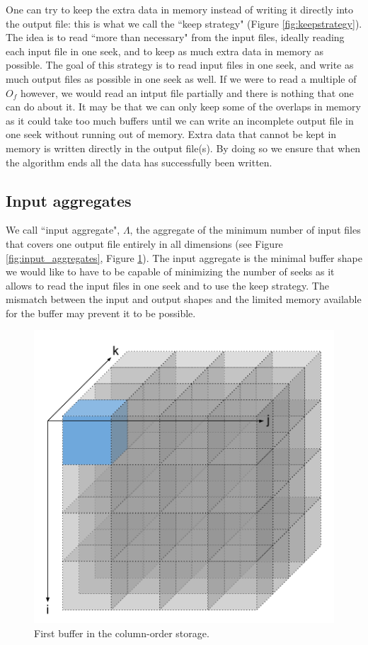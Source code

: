 \documentclass[conference]{IEEEtran}
\begin{document}
One can try to keep the extra data in memory instead of writing it directly into the output file: this is what we call the ``keep strategy" (Figure \ref{fig:keepstrategy}).
The idea is to read ``more than necessary" from the input files, ideally reading each input file in one seek, and to keep as much extra data in memory as possible.
The goal of this strategy is to read input files in one seek, and write as much output files as possible in one seek as well.
If we were to read a multiple of $O_f$ however, we would read an intput file partially and there is nothing that one can do about it.
It may be that we can only keep some of the overlaps in memory as it could take too much buffers until we can write an incomplete output file in one seek without running out of memory.
Extra data that cannot be kept in memory is written directly in the output file(s).
By doing so we ensure that when the algorithm ends all the data has successfully been written.

\subsection{Input aggregates}
We call ``input aggregate", $\Lambda$, the aggregate of the minimum number of input files that covers one output file entirely in all dimensions (see Figure \ref{fig:input_aggregates}, Figure \ref{fig:firstbuffer}).
The input aggregate is the minimal buffer shape we would like to have to be capable of minimizing the number of seeks as it allows to read the input files in one seek and to use the keep strategy.
The mismatch between the input and output shapes and the limited memory available for the buffer may prevent it to be possible. \\

\begin{figure}[h]
\centering
\includegraphics[scale=0.2]{./figures/first_buffer.png}
\caption{First buffer in the column-order storage.
}
\label{fig:firstbuffer}
\end{figure}
\end{document}

